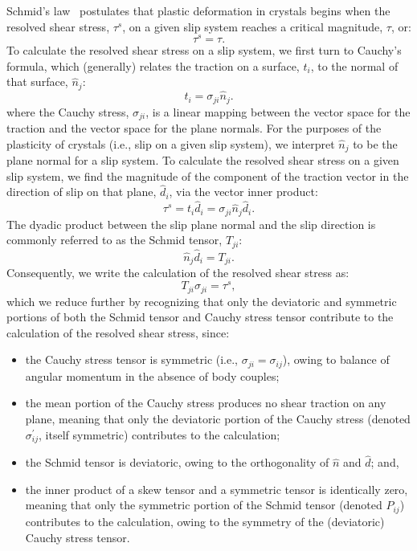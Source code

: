 \documentclass[preprint,3p,times,sort&compress,letterpaper,12pt]{elsarticle} %
\begin{document}
Schmid's law~\cite{Schmid1935} postulates that plastic deformation in crystals begins when the resolved shear stress, $\tau^s$, on a given slip system reaches a critical magnitude, $\tau$, or:
\begin{equation}
    \label{eq:rsseqcrss}
    \tau^s = \tau .
\end{equation}
To calculate the resolved shear stress on a slip system, we first turn to Cauchy's formula, which (generally) relates the traction on a surface, $t_i$, to the normal of that surface, $\hat{n}_j$:
\begin{equation}
    t_i = \sigma_{ji} \hat{n}_j .
\end{equation}
where the Cauchy stress, $\sigma_{ji}$, is a linear mapping between the vector space for the traction and the vector space for the plane normals. For the purposes of the plasticity of crystals (i.e., slip on a given slip system), we interpret $\hat{n}_j$ to be the plane normal for a slip system. To calculate the resolved shear stress on a given slip system, we find the magnitude of the component of the traction vector in the direction of slip on that plane, $\hat{d}_i$, via the vector inner product:
\begin{equation}
    \tau^s = t_i \hat{d}_i = \sigma_{ji} \hat{n}_j \hat{d}_i.
\end{equation}
The dyadic product between the slip plane normal and the slip direction is commonly referred to as the Schmid tensor, $T_{ji}$:
\begin{equation}
    \hat{n}_j \hat{d}_i = T_{ji}.
\end{equation}
Consequently, we write the calculation of the resolved shear stress as:
\begin{equation}
\label{eq:sx_yield_full}
    T_{ji} \sigma_{ji} = \tau^s,
\end{equation}
which we reduce further by recognizing that only the deviatoric and symmetric portions of both the Schmid tensor and Cauchy stress tensor contribute to the calculation of the resolved shear stress, since:
\begin{itemize}
    \item the Cauchy stress tensor is symmetric (i.e., $\sigma_{ji} = \sigma_{ij}$), owing to balance of angular momentum in the absence of body couples;
    \item the mean portion of the Cauchy stress produces no shear traction on any plane, meaning that only the deviatoric portion of the Cauchy stress (denoted $\sigma^\prime_{ij}$, itself symmetric) contributes to the calculation;
    \item the Schmid tensor is deviatoric, owing to the orthogonality of $\hat{n}$ and $\hat{d}$; and,
    \item the inner product of a skew tensor and a symmetric tensor is identically zero, meaning that only the symmetric portion of the Schmid tensor (denoted $P_{ij}$) contributes to the calculation, owing to the symmetry of the (deviatoric) Cauchy stress tensor.
\end{itemize}
\end{document}
